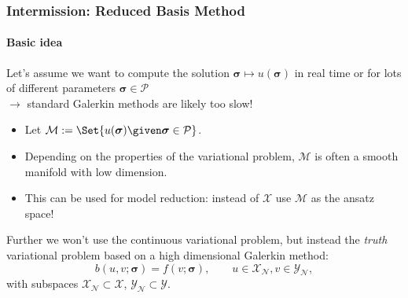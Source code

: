 \begin{frame}[t]
    \frametitle{Intermission: Reduced Basis Method}
    \framesubtitle{Basic idea}

    \onslide
    Let's assume we want to compute the solution $\bm \sigma \mapsto u(\bm \sigma)$ in real time or for lots of different parameters $\bm \sigma \in \mathcal P$\\
    $\rightarrow$ standard Galerkin methods are likely too slow!

    \begin{itemize}
        \item {}Let $\mathcal M := \Set{ u(\bm \sigma) \given \bm \sigma \in \mathcal P }$.
        \item Depending on the properties of the variational problem, $\mathcal M$ is often a smooth manifold with low dimension.
        \item {} This can be used for model reduction: instead of $\mathcal X$ use $\mathcal M$ as the ansatz space!
    \end{itemize}

    \vfill

    Further we won't use the continuous variational problem, but instead the \emph{truth} variational problem based on a high dimensional Galerkin method:
    \begin{equation}
        b(u, v; \bm \sigma) = f(v; \bm \sigma), \qquad u \in \mathcal X_{\mathcal N}, v \in \mathcal Y_{\mathcal N},
    \end{equation}
    with subspaces $\mathcal X_{\mathcal N} \subset \mathcal X$, $\mathcal Y_{\mathcal N} \subset \mathcal Y$.
\end{frame}


